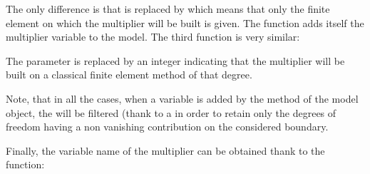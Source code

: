 \documentclass[a4paper,11pt,english]{sphinxmanual}
\begin{document}
\begin{sphinxVerbatim}[commandchars=\\\{\}]
  
                                          
                                           
\end{sphinxVerbatim}

The only difference is that  is replaced by  which means
that only the finite element on which the multiplier will be built is given. The
function adds itself the multiplier variable to the model. The third function is
very similar:

\begin{sphinxVerbatim}[commandchars=\\\{\}]
  
                                          
                                           
\end{sphinxVerbatim}

The parameter  is replaced by an integer  indicating that the
multiplier will be built on a classical finite element method of that degree.

Note, that in all the cases, when a variable is added by the method
 of the model object, the  will be filtered (thank to a
 in order to retain only the degrees of freedom having
a non vanishing contribution on the considered boundary.

Finally, the variable name of the multiplier can be obtained thank to the
function:

\begin{sphinxVerbatim}[commandchars=\\\{\}]
 
\end{sphinxVerbatim}
\end{document}
